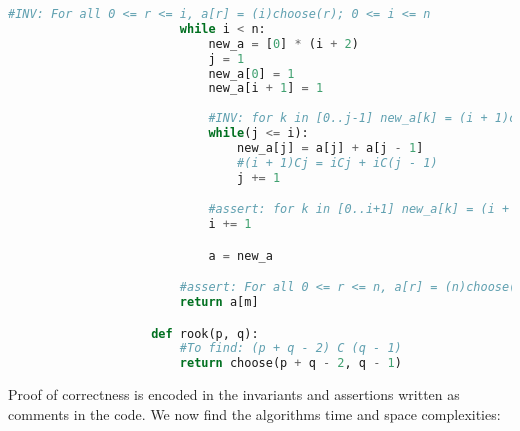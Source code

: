 \documentclass[answers]{exam}
\begin{document}
\begin{questions}
{\begin{parts}
\begin{solution}
\begin{lstlisting}[language=Python]
                        #INV: For all 0 <= r <= i, a[r] = (i)choose(r); 0 <= i <= n
                        while i < n:
                            new_a = [0] * (i + 2)
                            j = 1
                            new_a[0] = 1
                            new_a[i + 1] = 1
                            
                            #INV: for k in [0..j-1] new_a[k] = (i + 1)choose(k); 1<=j<=i+1
                            while(j <= i):
                                new_a[j] = a[j] + a[j - 1]
                                #(i + 1)Cj = iCj + iC(j - 1)
                                j += 1

                            #assert: for k in [0..i+1] new_a[k] = (i + 1)choose(k)   
                            i += 1

                            a = new_a

                        #assert: For all 0 <= r <= n, a[r] = (n)choose(r)
                        return a[m]

                    def rook(p, q):
                        #To find: (p + q - 2) C (q - 1)
                        return choose(p + q - 2, q - 1)
                \end{lstlisting}

                Proof of correctness is encoded in the invariants and assertions written as comments
                in the code. We now find the algorithms time and space complexities:


\end{solution}
\end{parts}}
\end{questions}
\end{document}
